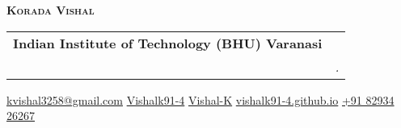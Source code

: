 \documentclass[letterpaper,11pt]{article}
\makeatletter
\newcommand{\resumeSubheading}[4]{
  \vspace{-2pt}\item
    \begin{tabular*}{0.97\textwidth}[t]{l@{\extracolsep{\fill}}r}
      \textbf{#1} & #2 \\
      \textit{\small#3} & \textit{\small #4} \\
    \end{tabular*}\vspace{-7pt}
}
\makeatother
\begin{document}

\begin{left}

    \textbf{\Huge \scshape Korada Vishal} \\ \vspace{3pt}
    \resumeSubheading {
    \color{blue}
    \Large
    {Indian Institute of Technology (BHU) Varanasi}
    }
    \small
    \hspace{.}
    
    { \color{blue} \faAt} \hspace{.5pt} \href{mailto:kvishal3258@gmail.com}{kvishal3258@gmail.com}
    \hspace{.5pt}
    { \color{blue} \faGithub} \hspace{.1pt} \href{https://github.com/Vishalk91-4}{Vishalk91-4}
    \hspace{.5pt}
    { \color{blue} \faLinkedin} \hspace{.1pt} \href{https://www.linkedin.com/in/vishal-k-2865b6254}{Vishal-K}
    \hspace{.5pt}
    { \color{blue} \faGlobe} \hspace{.1pt} \href{https://vishalk91-4.github.io/CV/}{vishalk91-4.github.io}
    \hspace{.5pt}
    { \color{blue} \faPhone} \hspace{.1pt} \href{tel:8293426267}{+91 82934 26267}
\end{left}


\end{document}
